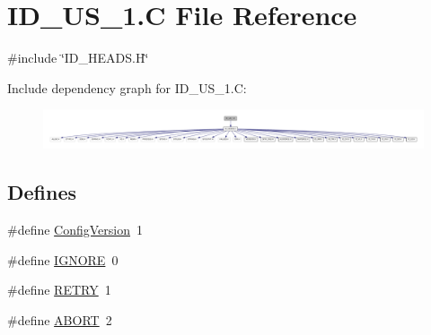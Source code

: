 \hypertarget{ID__US__1_8C}{
\section{ID\_\-US\_\-1.C File Reference}
\label{ID__US__1_8C}
}
{\ttfamily \#include \char`\"{}ID\_\-HEADS.H\char`\"{}}\par
Include dependency graph for ID\_\-US\_\-1.C:
\nopagebreak
\begin{figure}[H]
\begin{center}
\leavevmode
\includegraphics[width=400pt]{ID__US__1_8C__incl}
\end{center}
\end{figure}
\subsection*{Defines}
\begin{DoxyCompactItemize}
\item 
\#define \hyperlink{ID__US__1_8C_a473875c3ba4fabb07f31ce8b2e529310}{ConfigVersion}~1
\item 
\#define \hyperlink{ID__US__1_8C_aabed7f7d1400564ec843acd4dfb72e59}{IGNORE}~0
\item 
\#define \hyperlink{ID__US__1_8C_ab56f9f937902b77e7d2b1e52e004ce84}{RETRY}~1
\item 
\#define \hyperlink{ID__US__1_8C_a5376571bbf4cdc9782683635f366f89a}{ABORT}~2
\end{DoxyCompactItemize}
